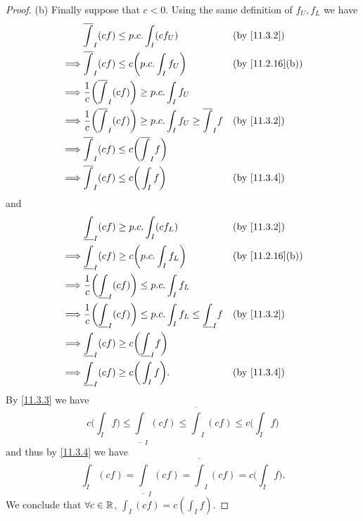 \begin{proof}{(b)}
  Finally suppose that \(c < 0\).
  Using the same definition of \(f_U, f_L\) we have
  \begin{align*}
             & \overline{\int}_I (cf) \leq p.c. \int_I (c f_U)                                               &  & \text{(by \cref{11.3.2})}     \\
    \implies & \overline{\int}_I (cf) \leq c \bigg(p.c. \int_I f_U\bigg)                                     &  & \text{(by \cref{11.2.16}(b))} \\
    \implies & \dfrac{1}{c} \bigg(\overline{\int}_I (cf)\bigg) \geq p.c. \int_I f_U                                                             \\
    \implies & \dfrac{1}{c} \bigg(\overline{\int}_I (cf)\bigg) \geq p.c. \int_I f_U \geq \overline{\int}_I f &  & \text{(by \cref{11.3.2})}     \\
    \implies & \overline{\int}_I (cf) \leq c\bigg(\overline{\int}_I f\bigg)                                                                     \\
    \implies & \overline{\int}_I (cf) \leq c\bigg(\int_I f\bigg)                                             &  & \text{(by \cref{11.3.4})}
  \end{align*}
  and
  \begin{align*}
             & \underline{\int}_I (cf) \geq p.c. \int_I (c f_L)                                                &  & \text{(by \cref{11.3.2})}     \\
    \implies & \underline{\int}_I (cf) \geq c \bigg(p.c. \int_I f_L\bigg)                                      &  & \text{(by \cref{11.2.16}(b))} \\
    \implies & \dfrac{1}{c} \bigg(\underline{\int}_I (cf)\bigg) \leq p.c. \int_I f_L                                                              \\
    \implies & \dfrac{1}{c} \bigg(\underline{\int}_I (cf)\bigg) \leq p.c. \int_I f_L \leq \underline{\int}_I f &  & \text{(by \cref{11.3.2})}     \\
    \implies & \underline{\int}_I (cf) \geq c\bigg(\underline{\int}_I f\bigg)                                                                     \\
    \implies & \underline{\int}_I (cf) \geq c\bigg(\int_I f\bigg).                                             &  & \text{(by \cref{11.3.4})}
  \end{align*}
  By \cref{11.3.3} we have
  \[
    c\bigg(\int_I f\bigg) \leq \underline{\int}_I (cf) \leq \overline{\int}_I (cf) \leq c\bigg(\int_I f\bigg)
  \]
  and thus by \cref{11.3.4} we have
  \[
    \int_I (cf) = \underline{\int}_I (cf) = \overline{\int}_I (cf) = c\bigg(\int_I f\bigg).
  \]
  We conclude that \(\forall c \in \mathbb{R}\), \(\int_I (cf) = c (\int_I f)\).
\end{proof}

